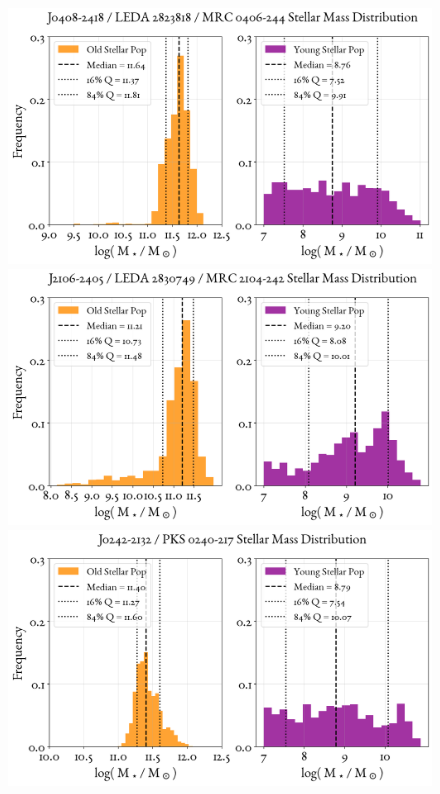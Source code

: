 \begin{figure}
    \centering
    \includegraphics[width=0.8\linewidth]{figures/ResultMasses/114_MassDistri_5353.png}\\
    \includegraphics[width=0.8\linewidth]{figures/ResultMasses/115_MassDistri_5355.png}\\
    \includegraphics[width=0.8\linewidth]{figures/ResultMasses/116_MassDistri_6000.png}    
\end{figure}
